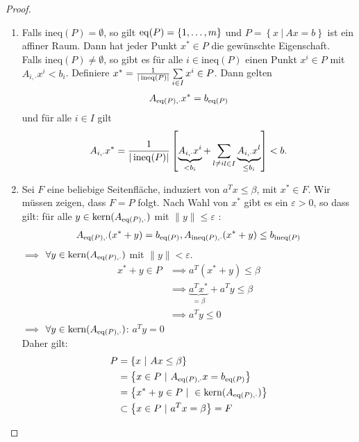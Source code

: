 \begin{proof}
	\begin{enumerate}[label = (\alph*)]
	\item Falls $\text{ineq}(P) = \emptyset$, so gilt $\operatorname{eq}(P) = \left\{ 1,\dots ,m \right\}$ und $P=\left\{ x \ |\ Ax=b \right\}$ ist ein affiner Raum. Dann hat jeder Punkt $x^* \in P$ die gewünschte Eigenschaft.\\
		Falls  $\text{ineq}(P)\neq\emptyset$, so gibt es für alle $i\in \text{ineq}(P)$ einen Punkt  $x^i \in P$ mit $A_{i,\cdot}x^i <b_{i}$. Definiere $x^* = \frac{1}{|\operatorname{ineq}(P)|}\sum\limits_{i \in I}^{} x^i \in P$. 
		Dann gelten 
		\begin{align*}
			A_{\operatorname{eq}(P),\cdot}x^* = b_{\operatorname{eq}(P)}
		\end{align*}
		und für alle $i \in I$ gilt
		\begin{align*}
			A_{i,\cdot} x^* = \frac{1}{|\operatorname{ineq}(P)|}\left[ \underbrace{A_{i,\cdot}x^i}_{< b_{i}} + \sum\limits_{l \neq i\substack{l \in I}}^{} \underbrace{A_{i,\cdot}x^l}_{\leq b_{i}} \right] < b.
		\end{align*}
	\item Sei $F$ eine beliebige Seitenfläche, induziert von $a^{T} x \leq \beta$, mit $x^*\in F$.
		Wir müssen zeigen, dass $F=P$ folgt.
		Nach Wahl von $x^*$ gibt es ein $\varepsilon > 0$, so dass gilt: für alle $y\in \text{kern}(A_{\operatorname{eq}(P),\cdot})$ mit $ \|y\| \leq \varepsilon$ :
		\begin{align*}
			A_{\operatorname{eq}(P),\cdot}(x^*+y) = b_{\operatorname{eq}(P)}, A_{\operatorname{ineq}(P),\cdot}(x^*+y) \leq b_{\operatorname{ineq}(P)}
		\end{align*}
		$\implies$ $\forall y \in \text{kern}(A_{\operatorname{eq}(P),\cdot})$ mit  $\|y\| < \varepsilon$.
		 \begin{align*}
			 x^*+y \in P &\implies a^{T} (x^* +y) \leq \beta\\
						 &\implies \underbrace{a^{T} x^*}_{=\beta} + a^{T} y \leq \beta\\
						 &\implies a^{T} y \leq 0
		\end{align*}
		$\implies$ $\forall y \in \text{kern}(A_{\operatorname{eq}(P),\cdot})$: $a^{T} y =0$ \\
		Daher gilt:
		\begin{align*}
			P &= \left\{ x \ |\ Ax \leq \beta \right\} \\
			  &= \left\{x \in P \ |\ A_{\eq(P),\cdot}x= b_{\eq(P)} \right\}\\
			  &= \left\{x^* + y \in P \ | \  \in \text{kern}(A_{\eq(P),\cdot}) \right\}\\
			  &\subset \left\{ x \in P \ |\ a^{T} x = \beta  \right\} = F 

\end{align*}
\end{enumerate}
\end{proof}
